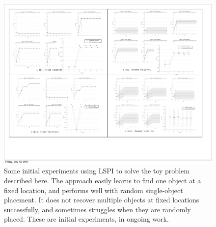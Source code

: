 \begin{figure}[h!]
  \centering
    \includegraphics[width=1\textwidth]{../figures/rl.pdf}
  \caption{Some initial experiments using LSPI to solve the toy problem described here. The approach easily learns to find one object at a fixed location, and performs well with random single-object placement. It does not recover multiple objects at fixed locations successfully, and sometimes struggles when they are randomly placed. These are initial experiments, in ongoing work.}
  \label{fig:rl}
\end{figure}